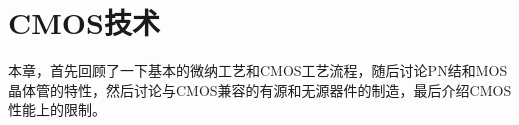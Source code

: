 \chapter{CMOS技术}
本章，首先回顾了一下基本的微纳工艺和CMOS工艺流程，随后讨论PN结和MOS晶体管的特性，然后讨论与CMOS兼容的有源和无源器件的制造，最后介绍CMOS性能上的限制。


